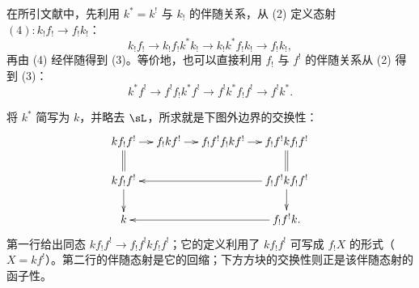 在所引文献中，先利用 $k^*=k^!$ 与 $k_!$ 的伴随关系，从 (2) 定义态射 $(4):k_!f_!\to f_!k_!$：
\[
k_!f_!\longrightarrow k_!f_!k^*k_!
\longrightarrow k_!k^*f_!k_!\longrightarrow f_!k_!,
\]
再由 (4) 经伴随得到 (3)。等价地，也可以直接利用 $f_!$ 与 $f^!$ 的伴随关系从 (2) 得到 (3)：
\[
k^*f^!\longrightarrow f^!f_!k^*f^!
\longrightarrow f^!k^*f_!f^!\longrightarrow f^!k^*.
\]

将 $k^*$ 简写为 $k$，并略去 $\sL$，所求就是下图外边界的交换性：
\[\xymatrix@C=12pt@R=18pt{
kf_!f^!\ar[r]\ar@{=}[d]&f_!kf^!\ar[r]&f_!f^!f_!kf^!\ar[r]&f_!f^!kf_!f^!\ar@{=}[d]\\
kf_!f^!\ar[d]&&&\ar[lll]f_!f^!kf_!f^!\ar[d]\\
k&&&\ar[lll]f_!f^!k.
}\]
第一行给出同态 $kf_!f^!\to f_!f^!kf_!f^!$；它的定义利用了 $kf_!f^!$ 可写成 $f_!X$ 的形式（$X=kf^!$）。第二行的伴随态射是它的回缩；下方方块的交换性则正是该伴随态射的函子性。
